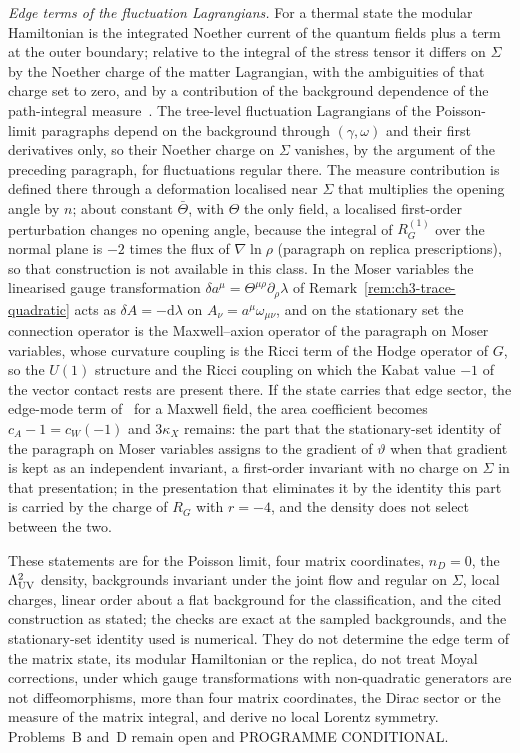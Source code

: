 \emph{Edge terms of the fluctuation Lagrangians.} For a thermal state the modular Hamiltonian is the integrated Noether current of the quantum fields plus a term at the outer boundary; relative to the integral of the stress tensor it differs on \(\Sigma\) by the Noether charge of the matter Lagrangian, with the ambiguities of that charge set to zero, and by a contribution of the background dependence of the path-integral measure~\cite{Chen2022}. The tree-level fluctuation Lagrangians of the Poisson-limit paragraphs depend on the background through \((\gamma,\omega)\) and their first derivatives only, so their Noether charge on \(\Sigma\) vanishes, by the argument of the preceding paragraph, for fluctuations regular there. The measure contribution is defined there through a deformation localised near \(\Sigma\) that multiplies the opening angle by \(n\); about constant \(\bar\Theta\), with \(\Theta\) the only field, a localised first-order perturbation changes no opening angle, because the integral of \(R_G^{(1)}\) over the normal plane is \(-2\) times the flux of \(\nabla\ln\rho\) (paragraph on replica prescriptions), so that construction is not available in this class. In the Moser variables the linearised gauge transformation \(\delta a^\mu=\Theta^{\mu\rho}\partial_\rho\lambda\) of Remark~\ref{rem:ch3-trace-quadratic} acts as \(\delta A=-\mathrm d\lambda\) on \(A_\nu=a^\mu\omega_{\mu\nu}\), and on the stationary set the connection operator is the Maxwell--axion operator of the paragraph on Moser variables, whose curvature coupling is the Ricci term of the Hodge operator of \(G\), so the \(U(1)\) structure and the Ricci coupling on which the Kabat value \(-1\) of the vector contact rests are present there. If the state carries that edge sector, the edge-mode term of~\cite{DonnellyWall2016} for a Maxwell field, the area coefficient becomes \(c_A-1=c_W(-1)\) and \(3\kappa_X\) remains: the part that the stationary-set identity of the paragraph on Moser variables assigns to the gradient of \(\vartheta\) when that gradient is kept as an independent invariant, a first-order invariant with no charge on \(\Sigma\) in that presentation; in the presentation that eliminates it by the identity this part is carried by the charge of \(R_G\) with \(r=-4\), and the density does not select between the two.

These statements are for the Poisson limit, four matrix coordinates, \(n_D=0\), the \(\Lambda_{\mathrm{UV}}^2\) density, backgrounds invariant under the joint flow and regular on \(\Sigma\), local charges, linear order about a flat background for the classification, and the cited construction as stated; the checks are exact at the sampled backgrounds, and the stationary-set identity used is numerical. They do not determine the edge term of the matrix state, its modular Hamiltonian or the replica, do not treat Moyal corrections, under which gauge transformations with non-quadratic generators are not diffeomorphisms, more than four matrix coordinates, the Dirac sector or the measure of the matrix integral, and derive no local Lorentz symmetry. Problems~B and~D remain open and PROGRAMME CONDITIONAL.

